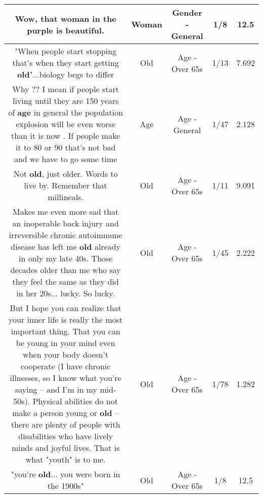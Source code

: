 \documentclass[11pt]{article}
\newlength\mylength
\begin{document}
\begin{center}
\begin{longtable}{|C{.65\mylength}|C{.30\mylength}|C{.12\mylength}|C{.12\mylength}|C{.12\mylength}|}
  \small Wow, that \textbf{woman} in the purple is beautiful.\normalsize   & Woman & Gender - General & 1/8 & 12.5 \\  \hline
  \small "When people start stopping that's when they start getting \textbf{old}"...biology begs to differ\normalsize   & Old & Age - Over 65s & 1/13 & 7.692 \\  \hline
  \small Why ?? I mean if people start living until they are 150 years of \textbf{age} in general the population explosion will be even worse than it is now . If people make it to 80 or 90  that's not bad and we have to go some time\normalsize   & Age & Age - General & 1/47 & 2.128 \\  \hline
  \small Not \textbf{old}, just older. Words to live by. Remember that millineals.\normalsize   & Old & Age - Over 65s & 1/11 & 9.091 \\  \hline
  \small Makes me even more sad that an inoperable back injury and irreversible chronic autoimmune disease has left me \textbf{old} already in only my late 40s. Those decades older than me who say they feel the same as they did in her 20s... lucky. So lucky.\normalsize   & Old & Age - Over 65s & 1/45 & 2.222 \\  \hline
  \small But I hope you can realize that your inner life is really the most important thing. That you can be young in your mind even when your body doesn't cooperate (I have chronic illnesses, so I know what you're saying -- and I'm in my mid-50s). Physical abilities do not make a person young or \textbf{old} -- there are plenty of people with disabilities who have lively minds and joyful lives. That is what "youth" is to me.\normalsize   & Old & Age - Over 65s & 1/78 & 1.282 \\  \hline
  \small "you're \textbf{old}... you were born in the 1900s"\normalsize   & Old & Age - Over 65s & 1/8 & 12.5 \\  \hline

\end{longtable}
\end{center}
\end{document}
